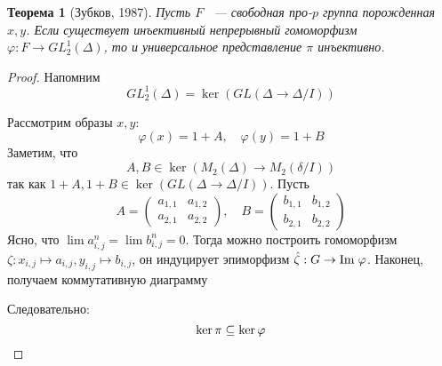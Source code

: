 \documentclass[12pt,a4paper]{article}
\newtheorem{theorem}{Теорема}[section]
\begin{document}
    \vskip 0.1in\noindent
    \begin{theorem}[Зубков, 1987]
        Пусть $F$ ~--- свободная про-$p$ группа порожденная $x, y$.
        Если существует инъективный непрерывный гомоморфизм $\varphi: F \to GL^1_2(\Delta)$, то и универсальное представление $\pi$ инъективно.
    \end{theorem}
    \begin{proof}
        Напомним
        \[
            GL^1_2(\Delta) = \ker{(GL(\Delta \to \Delta / I))}
        \]

        Рассмотрим образы $x, y$:
        \[
            \varphi(x) = 1 + A, \quad
            \varphi(y) = 1 + B
        \]
        Заметим, что
        \[
            A, B \in \ker{(M_2(\Delta)\to M_2(\delta/I))}
        \]
        так как $1 + A, 1 + B \in \ker{(GL(\Delta \to \Delta / I))}$.
        Пусть
        \[
            A=
            \begin{pmatrix}
                a_{1,1} & a_{1,2} \\
                a_{2,1} & a_{2,2}
            \end{pmatrix},
            \quad
            B=
            \begin{pmatrix}
                b_{1,1} & b_{1,2} \\
                b_{2,1} & b_{2,2}
            \end{pmatrix}
        \]
        Ясно, что $\lim a_{i,j}^n = \lim b_{i,j}^n = 0$.
        Тогда можно построить гомоморфизм $\zeta: x_{i,j} \mapsto a_{i,j}, y_{i,j} \mapsto b_{i,j}$, он индуцирует эпиморфизм
        $\hat{\zeta}: G \to \mathrm{Im}\hspace{0.1cm}{\varphi}$.
        Наконец, получаем коммутативную диаграмму
        \begin{center}
        \end{center}
        Следовательно:
        \[
            \ker{\pi} \subseteq \ker{\varphi} \qedhere
        \]

    \end{proof}
\end{document}
